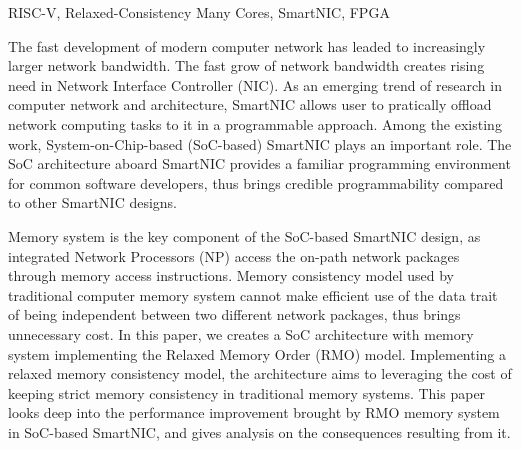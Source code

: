 \documentclass[supercite,gbt15cite,notofont]{HustGraduPaper}
\begin{document}
\begin{enabstract}{RISC-V, Relaxed-Consistency Many Cores, SmartNIC, FPGA}

The fast development of modern computer network has leaded to increasingly
larger network bandwidth. The fast grow of network bandwidth creates rising need
in Network Interface Controller (NIC). As an emerging trend of research in
computer network and architecture, SmartNIC allows user to pratically offload
network computing tasks to it in a programmable approach. Among the existing
work, System-on-Chip-based (SoC-based) SmartNIC plays an important role. The SoC
architecture aboard SmartNIC provides a familiar programming environment for
common software developers, thus brings credible programmability compared to
other SmartNIC designs.

Memory system is the key component of the SoC-based SmartNIC design, as
integrated Network Processors (NP) access the on-path network packages through
memory access instructions. Memory consistency model used by traditional
computer memory system cannot make efficient use of the data trait of being
independent between two different network packages, thus brings unnecessary
cost. In this paper, we creates a SoC architecture with memory system
implementing the Relaxed Memory Order (RMO) model. Implementing a relaxed
memory consistency model, the architecture aims to leveraging the cost of
keeping strict memory consistency in traditional memory systems. This paper
looks deep into the performance improvement brought by RMO memory system in
SoC-based SmartNIC, and gives analysis on the consequences resulting from it.

\end{enabstract}

\tableofcontents[level=2]

\clearpage









\begin{thankpage}









\end{thankpage}


\end{document}
